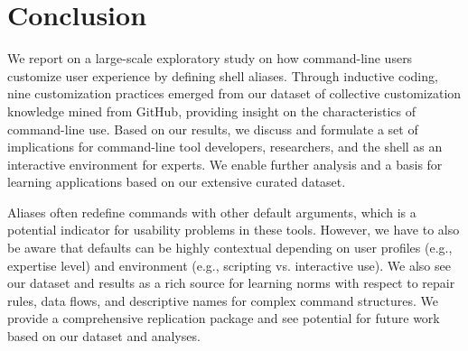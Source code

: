 \documentclass[sigconf,nonacm,screen]{acmart}
\begin{document}
\section{Conclusion}

We report on a large-scale exploratory study on how command-line users customize user experience by defining shell aliases.
Through inductive coding, nine customization practices emerged from our dataset of collective customization knowledge mined from GitHub, providing insight on the characteristics of command-line use.
Based on our results, we discuss and formulate a set of implications for command-line tool developers, researchers, and the shell as an interactive environment for experts.
We enable further analysis and a basis for learning applications based on our extensive curated dataset.

Aliases often redefine commands with other default arguments, which is a potential indicator for usability problems in these tools.
However, we have to also be aware that defaults can be highly contextual depending on user profiles (e.g., expertise level) and environment (e.g., scripting vs. interactive use).
We also see our dataset and results as a rich source for learning norms with respect to repair rules, data flows, and descriptive names for complex command structures.
We provide a comprehensive replication package and see potential for future work based on our dataset and analyses.



\end{document}
